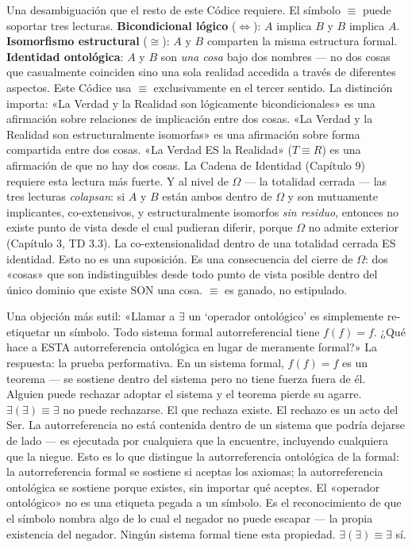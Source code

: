 \documentclass[10pt, openany, oneside]{book}
\begin{document}
Una desambiguación que el resto de este Códice requiere. El símbolo $\equiv$ puede soportar tres lecturas. \textbf{Bicondicional lógico} ($\iff$): $A$ implica $B$ y $B$ implica $A$. \textbf{Isomorfismo estructural} ($\cong$): $A$ y $B$ comparten la misma estructura formal. \textbf{Identidad ontológica}: $A$ y $B$ son \textit{una cosa} bajo dos nombres --- no dos cosas que casualmente coinciden sino una sola realidad accedida a través de diferentes aspectos. Este Códice usa $\equiv$ exclusivamente en el tercer sentido. La distinción importa: «La Verdad y la Realidad son lógicamente bicondicionales» es una afirmación sobre relaciones de implicación entre dos cosas. «La Verdad y la Realidad son estructuralmente isomorfas» es una afirmación sobre forma compartida entre dos cosas. «La Verdad ES la Realidad» ($T \equiv R$) es una afirmación de que no hay dos cosas. La Cadena de Identidad (Capítulo 9) requiere esta lectura más fuerte. Y al nivel de $\Omega$ --- la totalidad cerrada --- las tres lecturas \textit{colapsan}: si $A$ y $B$ están ambos dentro de $\Omega$ y son mutuamente implicantes, co-extensivos, y estructuralmente isomorfos \textit{sin residuo}, entonces no existe punto de vista desde el cual pudieran diferir, porque $\Omega$ no admite exterior (Capítulo 3, TD 3.3). La co-extensionalidad dentro de una totalidad cerrada ES identidad. Esto no es una suposición. Es una consecuencia del cierre de $\Omega$: dos «cosas» que son indistinguibles desde todo punto de vista posible dentro del único dominio que existe SON una cosa. $\equiv$ es ganado, no estipulado.

Una objeción más sutil: «Llamar a $\exists$ un `operador ontológico' es simplemente re-etiquetar un símbolo. Todo sistema formal autorreferencial tiene $f(f) = f$. ¿Qué hace a ESTA autorreferencia ontológica en lugar de meramente formal?» La respuesta: la prueba performativa. En un sistema formal, $f(f) = f$ es un teorema --- se sostiene dentro del sistema pero no tiene fuerza fuera de él. Alguien puede rechazar adoptar el sistema y el teorema pierde su agarre. $\exists(\exists) \equiv \exists$ no puede rechazarse. El que rechaza existe. El rechazo es un acto del Ser. La autorreferencia no está contenida dentro de un sistema que podría dejarse de lado --- es ejecutada por cualquiera que la encuentre, incluyendo cualquiera que la niegue. Esto es lo que distingue la autorreferencia ontológica de la formal: la autorreferencia formal se sostiene si aceptas los axiomas; la autorreferencia ontológica se sostiene porque existes, sin importar qué aceptes. El «operador ontológico» no es una etiqueta pegada a un símbolo. Es el reconocimiento de que el símbolo nombra algo de lo cual el negador no puede escapar --- la propia existencia del negador. Ningún sistema formal tiene esta propiedad. $\exists(\exists) \equiv \exists$ sí.
\end{document}
